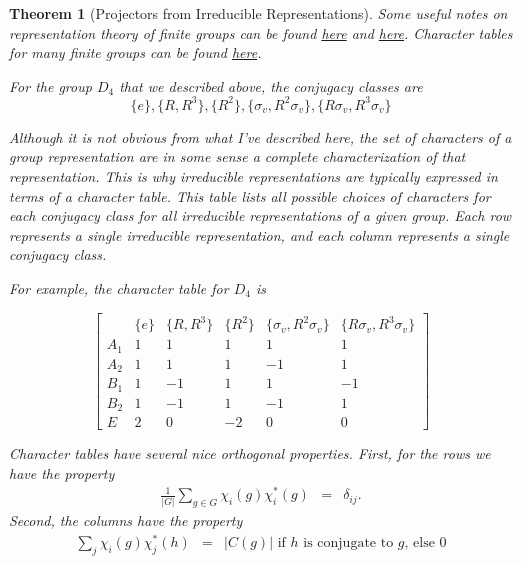 \documentclass{article}
\newtheorem{theorem}{Theorem}[section]
\theoremstyle{definition}
\begin{document}
\begin{theorem}[Projectors from Irreducible Representations]
Some useful notes on representation theory of finite groups can be found \href{https://www.math.uni-bielefeld.de/~ccheng/Notes/RTnotes.pdf}{here} and \href{https://web.stanford.edu/~aaronlan/assets/representation-theory.pdf}{here}. Character tables for many finite groups can be found \href{https://people.maths.bris.ac.uk/~matyd/GroupNames/index.html}{here}.

For the group $D_4$ that we described above, the conjugacy classes are 
\begin{equation}
\{e\}, \{R, R^3\},\{R^2\}, \{\sigma_v, R^2 \sigma_v\}, \{R \sigma_v, R^3 \sigma_v\}
\end{equation}

Although it is not obvious from what I've described here, the set of characters of a group representation are in some sense a complete characterization of that representation. This is why irreducible representations are typically expressed in terms of a \emph{character table}. This table lists all possible choices of characters for each conjugacy class for all irreducible representations of a given group. Each row represents a single irreducible representation, and each column represents a single conjugacy class. 

For example, the character table for $D_4$ is 

\begin{equation}
\begin{bmatrix}
& \{e\} & \{R, R^3\} & \{R^2\} & \{\sigma_v, R^2 \sigma_v\} & \{R \sigma_v, R^3 \sigma_v\}\\
A_1 & 1 & 1 & 1 & 1 & 1\\
A_2 & 1 & 1 &1 & -1 & 1\\
B_1 & 1 & -1 & 1 & 1 & -1\\
B_2 & 1 & -1 & 1 & -1 & 1\\
E & 2 & 0 & - 2 & 0 & 0
\end{bmatrix}
\end{equation}

Character tables have several nice orthogonal properties. First, for the rows we have the property
\begin{eqnarray}
\frac{1}{|G|} \sum_{g \in G} \chi_i(g) \chi_i^*(g) &=& \delta_{ij}. \label{eq:row_orthogonality}
\end{eqnarray}
Second, the columns have the property
\begin{eqnarray}
\sum_j \chi_i(g) \chi_j^*(h) &=& |C(g)| \text{ if $h$ is conjugate to $g$, else $0$} \label{eq:column_orthogonality}
\end{eqnarray}


\end{theorem}
\end{document}
